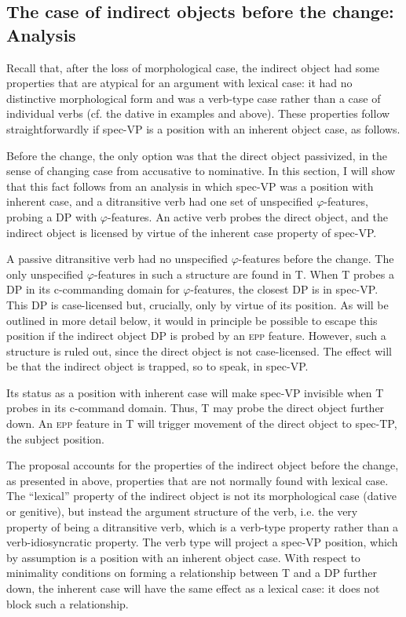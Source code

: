 \documentclass[output=paper]{langscibook}
\begin{document}
\subsection{The case of indirect objects before the change: Analysis}\label{sec:falk:4.2}


Recall that, after the loss of morphological case, the indirect object had some properties that are atypical for an argument with lexical case: it had no distinctive morphological form and was a verb-type case rather than a case of individual verbs (cf. the dative in examples  and  above). These properties follow straightforwardly if spec-VP is a position with an inherent object case, as follows.


Before the change, the only option was that the direct object passivized, in the sense of changing case from accusative to nominative. In this section, I will show that this fact follows from an analysis in which spec-VP was a position with inherent case, and a ditransitive verb had one set of unspecified $\varphi ${}-features, probing a DP with $\varphi $-features. An active verb probes the direct object, and the indirect object is licensed by virtue of the inherent case property of spec-VP. 



A passive ditransitive verb had no unspecified $\varphi $-features before the change. The only unspecified $\varphi $-features in such a structure are found in T. When T probes a DP in its c-commanding domain for $\varphi $-features, the closest DP is in spec-VP. This DP is case-licensed but, crucially, only by virtue of its position. As will be outlined in more detail below, it would in principle be possible to escape this position if the indirect object DP is probed by an \textsc{epp} feature. However, such a structure is ruled out, since the direct object is not case-licensed. The effect will be that the indirect object is trapped, so to speak, in spec-VP. 



Its status as a position with inherent case will make spec-VP invisible when T probes in its c-command domain. Thus, T may probe the direct object further down. An \textsc{epp} feature in T will trigger movement of the direct object to spec-TP, the subject position.


\begin{sloppypar}
The proposal accounts for the properties of the indirect object before the change, as presented in  above, properties that are not normally found with lexical case. The “lexical” property of the indirect object is not its morphological case (dative or genitive), but instead the argument structure of the verb, i.e. the very property of being a ditransitive verb, which is a verb-type property rather than a verb-idiosyncratic property. The verb type will project a spec-VP position, which by assumption is a position with an inherent object case. With respect to minimality conditions on forming a relationship between T and a DP further down, the inherent case will have the same effect as a lexical case: it does not block such a relationship.
\end{sloppypar}
\end{document}
